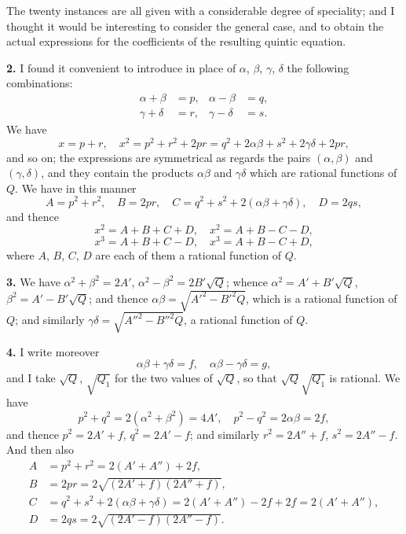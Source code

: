 \documentclass[11pt,a4paper]{book}
\begin{document}
The twenty instances are all given with a considerable degree of speciality; and I thought it would be interesting to consider the general case, and to obtain the actual expressions for the coefficients of the resulting quintic equation.

\vspace{0.5em}
\textbf{2.} I found it convenient to introduce in place of $\alpha$, $\beta$, $\gamma$, $\delta$ the following combinations:
\begin{align*}
\alpha + \beta &= p, & \alpha - \beta &= q, \\
\gamma + \delta &= r, & \gamma - \delta &= s.
\end{align*}
We have
\[
x = p + r, \quad x^2 = p^2 + r^2 + 2pr = q^2 + 2\alpha\beta + s^2 + 2\gamma\delta + 2pr,
\]
and so on; the expressions are symmetrical as regards the pairs $(\alpha, \beta)$ and $(\gamma, \delta)$, and they contain the products $\alpha\beta$ and $\gamma\delta$ which are rational functions of $Q$. We have in this manner
\[
A = p^2 + r^2, \quad B = 2pr, \quad C = q^2 + s^2 + 2(\alpha\beta + \gamma\delta), \quad D = 2qs,
\]
and thence
\[
x^2 = A + B + C + D, \quad x^2 = A + B - C - D,
\]
\[
x^3 = A + B + C - D, \quad x^3 = A + B - C + D,
\]
where $A$, $B$, $C$, $D$ are each of them a rational function of $Q$.

\vspace{0.5em}
\textbf{3.} We have $\alpha^2 + \beta^2 = 2A'$, $\alpha^2 - \beta^2 = 2B'\sqrt{Q}$; whence $\alpha^2 = A' + B'\sqrt{Q}$, $\beta^2 = A' - B'\sqrt{Q}$; and thence $\alpha\beta = \sqrt{A'^2 - B'^2Q}$, which is a rational function of $Q$; and similarly $\gamma\delta = \sqrt{A''^2 - B''^2Q}$, a rational function of $Q$.

\vspace{0.5em}
\textbf{4.} I write moreover
\[
\alpha\beta + \gamma\delta = f, \quad \alpha\beta - \gamma\delta = g,
\]
and I take $\sqrt{Q}$, $\sqrt{Q_1}$ for the two values of $\sqrt{Q}$, so that $\sqrt{Q}\sqrt{Q_1}$ is rational. We have
\[
p^2 + q^2 = 2(\alpha^2 + \beta^2) = 4A', \quad p^2 - q^2 = 2\alpha\beta = 2f,
\]
and thence $p^2 = 2A' + f$, $q^2 = 2A' - f$; and similarly $r^2 = 2A'' + f$, $s^2 = 2A'' - f$. And then also
\begin{align*}
A &= p^2 + r^2 = 2(A' + A'') + 2f, \\
B &= 2pr = 2\sqrt{(2A' + f)(2A'' + f)}, \\
C &= q^2 + s^2 + 2(\alpha\beta + \gamma\delta) = 2(A' + A'') - 2f + 2f = 2(A' + A''), \\
D &= 2qs = 2\sqrt{(2A' - f)(2A'' - f)}.
\end{align*}
\end{document}
